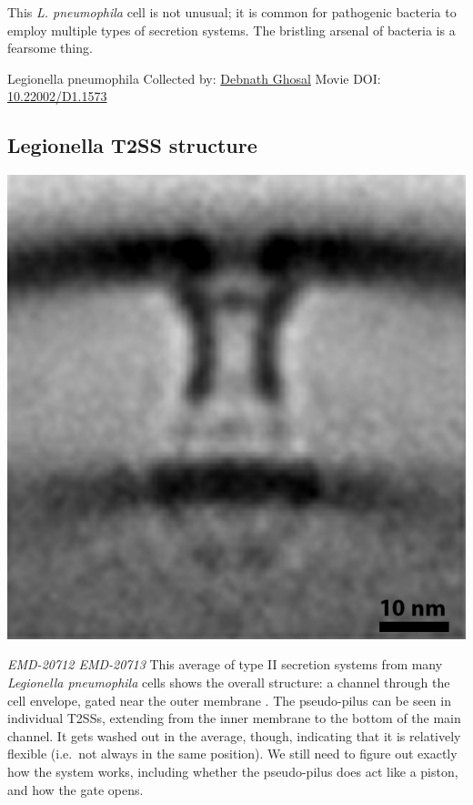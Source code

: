 \documentclass[]{tufte-book}
\begin{document}
This \emph{L. pneumophila} cell is not unusual; it is common for pathogenic bacteria to employ multiple types of secretion systems. The bristling arsenal of bacteria is a fearsome thing.



\hypertarget{htmlwidget-99e60d9c02a3de7f586a}{}

\label{fig:9-3}Legionella pneumophila Collected by: \protect\hyperlink{debnath_ghosal}{Debnath Ghosal} Movie DOI: \href{https://doi.org/10.22002/D1.1573}{10.22002/D1.1573}

\hypertarget{Legionella_T2SS_structure}{%
\subsection{Legionella T2SS structure}\label{Legionella_T2SS_structure}}

\includegraphics{img/schematics/9_3_1}

\emph{EMD-20712 EMD-20713}
This average of type II secretion systems from many \emph{Legionella pneumophila} cells shows the overall structure: a channel through the cell envelope, gated near the outer membrane \citep{ghosal2019}. The pseudo-pilus can be seen in individual T2SSs, extending from the inner membrane to the bottom of the main channel. It gets washed out in the average, though, indicating that it is relatively flexible (i.e.~not always in the same position). We still need to figure out exactly how the system works, including whether the pseudo-pilus does act like a piston, and how the gate opens.
\end{document}
